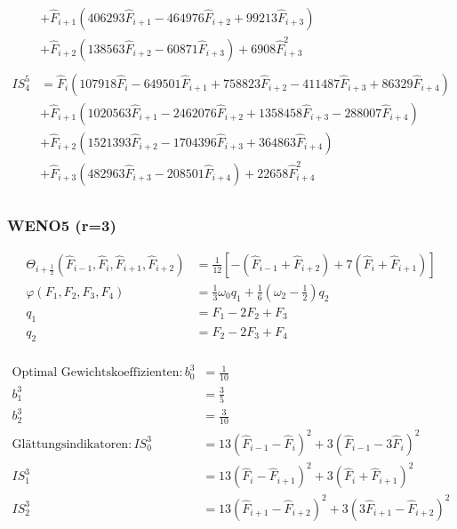 \begin{align*}
&+ \hat{F}_{i+1} (406293 \hat{F}_{i+1} - 464976 \hat{F}_{i+2} + 99213 \hat{F}_{i+3})\\
&+ \hat{F}_{i+2} (138563 \hat{F}_{i+2} - 60871 \hat{F}_{i+3}) + 6908 \hat{F}_{i+3}^2\\
\\
IS^5_4 &= \hat{F}_{i} (107918 \hat{F}_{i} - 649501 \hat{F}_{i+1} + 758823 \hat{F}_{i+2} - 411487 \hat{F}_{i+3} + 86329 \hat{F}_{i+4})\\
&+ \hat{F}_{i+1} (1020563 \hat{F}_{i+1} - 2462076 \hat{F}_{i+2} + 1358458 \hat{F}_{i+3} - 288007 \hat{F}_{i+4})\\
&+ \hat{F}_{i+2} (1521393 \hat{F}_{i+2} - 1704396 \hat{F}_{i+3} + 364863 \hat{F}_{i+4})\\
&+ \hat{F}_{i+3} (482963 \hat{F}_{i+3} - 208501 \hat{F}_{i+4}) + 22658 \hat{F}_{i+4}^2\\
\end{align*}

\subsubsection{WENO5 (r=3)}
\begin{align*}
\Theta_{i+\frac{1}{2}} \left(\hat{F}_{i-1},\hat{F}_{i},\hat{F}_{i+1},\hat{F}_{i+2}\right)&=
\frac{1}{12}
\left[
-\left(\hat{F}_{i-1}+\hat{F}_{i+2} \right)
+7\left(\hat{F}_{i}+\hat{F}_{i+1} \right)
\right]
\\
\varphi \left( F_1,F_2,F_3,F_4\right) &=
\frac{1}{3}\omega_0 q_1+
\frac{1}{6} \left(\omega_2 -\frac{1}{2}\right) q_2
\\
q_1&=F_1-2F_2+F_3\\ 
q_2&=F_2-2F_3+F_4\\ 
\end{align*}

\begin{align*}
\text{Optimal Gewichtskoeffizienten}:
b_0^3 &= \frac{1}{10}
\\
b_1^3 &= \frac{3}{5}
\\
b_2^3 &= \frac{3}{10}
\\
\text{Glättungsindikatoren}:
IS^3_0 &= 13 \left(\hat{F}_{i-1}-\hat{F}_{i}\right)^2 + 3 \left(\hat{F}_{i-1}-3\hat{F}_{i}\right)^2
\\
IS^3_1 &= 13 \left(\hat{F}_{i}-\hat{F}_{i+1}\right)^2 + 3 \left(\hat{F}_{i}+\hat{F}_{i+1}\right)^2
\\
IS^3_2 &= 13 \left(\hat{F}_{i+1}-\hat{F}_{i+2}\right)^2 + 3 \left(3\hat{F}_{i+1}-\hat{F}_{i+2}\right)^2
\end{align*}

